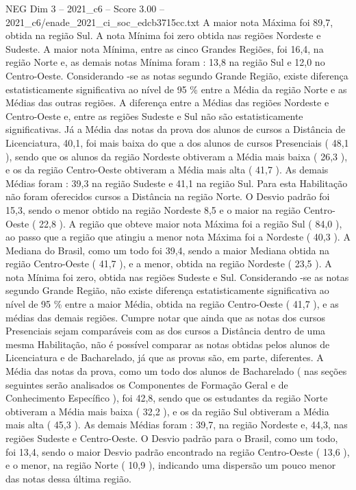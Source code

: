 \begin{textsample}{NEG Dim 3 – 2021\_c6 – Score 3.00 – 2021\_c6/enade\_2021\_ci\_soc\_edcb3715cc.txt}
A maior nota Máxima foi 89,7, obtida na região Sul.
A nota Mínima foi zero obtida nas regiões Nordeste e Sudeste.
A maior nota Mínima, entre as cinco Grandes Regiões, foi 16,4, na região Norte e, as demais notas Mínima foram : 13,8 na região Sul e 12,0 no Centro-Oeste.
Considerando -se as notas segundo Grande Região, existe diferença estatisticamente significativa ao nível de 95 \% entre a Média da região Norte e as Médias das outras regiões.
A diferença entre a Médias das regiões Nordeste e Centro-Oeste e, entre as regiões Sudeste e Sul não são estatisticamente significativas.
Já a Média das notas da prova dos alunos de cursos a Distância de Licenciatura, 40,1, foi mais baixa do que a dos alunos de cursos Presenciais ( 48,1 ), sendo que os alunos da região Nordeste obtiveram a Média mais baixa ( 26,3 ), e os da região Centro-Oeste obtiveram a Média mais alta ( 41,7 ).
As demais Médias foram : 39,3 na região Sudeste e 41,1 na região Sul.
Para esta Habilitação não foram oferecidos cursos a Distância na região Norte.
O Desvio padrão foi 15,3, sendo o menor obtido na região Nordeste 8,5 e o maior na região Centro-Oeste ( 22,8 ).
A região que obteve maior nota Máxima foi a região Sul ( 84,0 ), ao passo que a região que atingiu a menor nota Máxima foi a Nordeste ( 40,3 ).
A Mediana do Brasil, como um todo foi 39,4, sendo a maior Mediana obtida na região Centro-Oeste ( 41,7 ), e a menor, obtida na região Nordeste ( 23,5 ).
A nota Mínima foi zero, obtida nas regiões Sudeste e Sul.
Considerando -se as notas segundo Grande Região, não existe diferença estatisticamente significativa ao nível de 95 \% entre a maior Média, obtida na região Centro-Oeste ( 41,7 ), e as médias das demais regiões.
Cumpre notar que ainda que as notas dos cursos Presenciais sejam comparáveis com as dos cursos a Distância dentro de uma mesma Habilitação, não é possível comparar as notas obtidas pelos alunos de Licenciatura e de Bacharelado, já que as provas são, em parte, diferentes.
A Média das notas da prova, como um todo dos alunos de Bacharelado ( nas seções seguintes serão analisados os Componentes de Formação Geral e de Conhecimento Específico ), foi 42,8, sendo que os estudantes da região Norte obtiveram a Média mais baixa ( 32,2 ), e os da região Sul obtiveram a Média mais alta ( 45,3 ).
As demais Médias foram : 39,7, na região Nordeste e, 44,3, nas regiões Sudeste e Centro-Oeste.
O Desvio padrão para o Brasil, como um todo, foi 13,4, sendo o maior Desvio padrão encontrado na região Centro-Oeste ( 13,6 ), e o menor, na região Norte ( 10,9 ), indicando uma dispersão um pouco menor das notas dessa última região.

\end{textsample}
